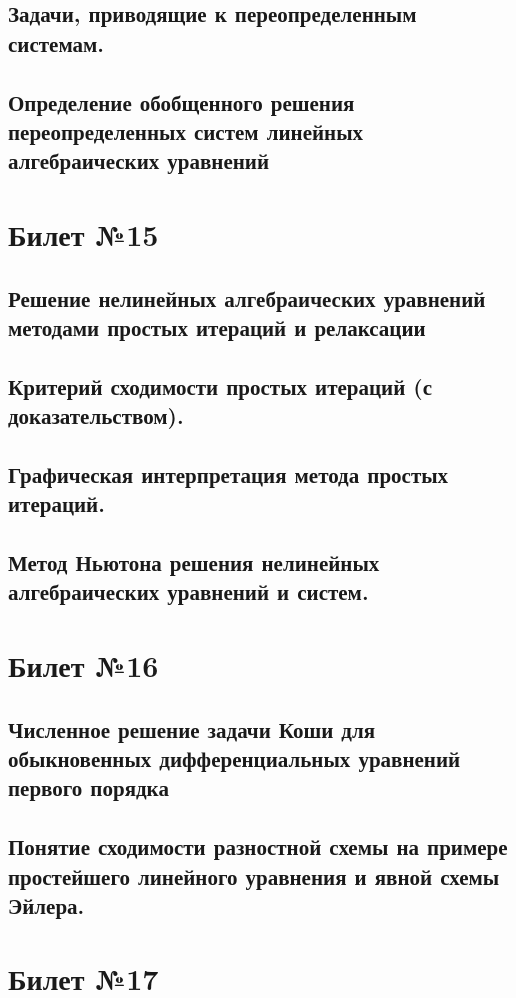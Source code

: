 \documentclass[a4paper]{article}
\begin{document}
\subsection{Задачи, приводящие к переопределенным системам. }
\subsection{Определение обобщенного решения переопределенных систем линейных алгебраических уравнений}

\section{Билет №15}
\subsection{Решение нелинейных алгебраических уравнений методами простых итераций и релаксации}
\subsection{Критерий сходимости простых итераций (с доказательством).}
\subsection{Графическая интерпретация метода простых итераций.}
\subsection{Метод Ньютона решения нелинейных алгебраических уравнений и систем.}

\section{Билет №16}
\subsection{Численное решение задачи Коши для обыкновенных дифференциальных уравнений первого порядка}
\subsection{Понятие сходимости разностной схемы на примере простейшего линейного уравнения и явной схемы Эйлера.}

\section{Билет №17}
\end{document}
